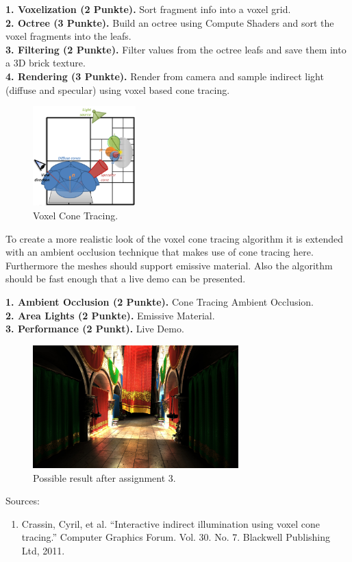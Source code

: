 \documentclass[A4paper]{gdv/gdv}
\newcommand{\teilaufgabe}[1]{\textbf{#1.}}
\begin{document}
\begin{gdvSheet}
\teilaufgabe{1. Voxelization (2 Punkte)} Sort fragment info into a voxel grid. \\
\teilaufgabe{2. Octree (3 Punkte)} Build an octree using Compute Shaders and sort the voxel fragments into the leafs. \\
\teilaufgabe{3. Filtering (2 Punkte)} Filter values from the octree leafs and save them into a 3D brick texture. \\
\teilaufgabe{4. Rendering (3 Punkte)} Render from camera and sample indirect light (diffuse and specular) using voxel based cone tracing. \\

\begin{figure}[h]
\centering
\includegraphics[width=150px]{img/voxel.png}
\caption{Voxel Cone Tracing.}
\end{figure}
  
To create a more realistic look of the voxel cone tracing algorithm it is extended with an ambient occlusion technique that makes use of cone tracing here. Furthermore the meshes should support emissive material. Also the algorithm should be fast enough that a live demo can be presented.

\teilaufgabe{1. Ambient Occlusion (2 Punkte)} Cone Tracing Ambient Occlusion. \\
\teilaufgabe{2. Area Lights (2 Punkte)} Emissive Material. \\
\teilaufgabe{3. Performance (2 Punkt)} Live Demo. \\

\begin{figure}[h]
\centering
\includegraphics[width=300px]{img/sponza-voxelcone.jpg}
\caption{Possible result after assignment 3.}
\end{figure}

Sources:
\begin{enumerate}
\item Crassin, Cyril, et al. ``Interactive indirect illumination using voxel cone tracing.'' Computer Graphics Forum. Vol. 30. No. 7. Blackwell Publishing Ltd, 2011.
\end{enumerate}

\vfill
% 
% 
\end{gdvSheet}
\end{document}
